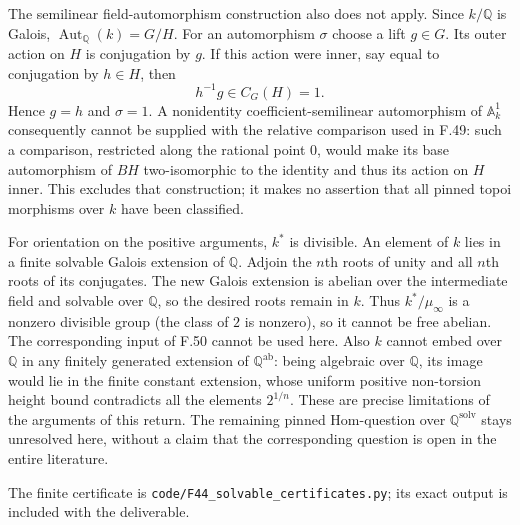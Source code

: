 The semilinear field-automorphism construction also does not apply.
Since $k/\mathbb Q$ is Galois,
$\operatorname{Aut}_{\mathbb Q}(k)=G/H$. For an automorphism
$\sigma$ choose a lift $g\in G$. Its outer action on $H$ is
conjugation by $g$. If this action were inner, say equal to
conjugation by $h\in H$, then
\[
                       h^{-1}g\in C_G(H)=1.
\]
Hence $g=h$ and $\sigma=1$. A nonidentity coefficient-semilinear
automorphism of $\mathbb A^1_k$ consequently cannot be supplied with
the relative comparison used in F.49: such a comparison, restricted
along the rational point $0$, would make its base automorphism of
$BH$ two-isomorphic to the identity and thus its action on $H$
inner. This excludes that construction; it makes no assertion that
all pinned topoi morphisms over $k$ have been classified.

For orientation on the positive arguments, $k^*$ is divisible.
An element of $k$ lies in a finite solvable Galois extension of
$\mathbb Q$. Adjoin the $n$th roots of unity and all $n$th roots
of its conjugates. The new Galois extension is abelian over the
intermediate field and solvable over $\mathbb Q$, so the desired
roots remain in $k$. Thus $k^*/\mu_\infty$ is a nonzero divisible group (the class of
$2$ is nonzero), so it cannot be free abelian. The corresponding
input of F.50 cannot be used here. Also $k$ cannot embed over $\mathbb Q$
in any finitely generated extension of $\mathbb Q^{\mathrm{ab}}$:
being algebraic over $\mathbb Q$, its image would lie in the finite
constant extension, whose uniform positive non-torsion height bound
contradicts all the elements $2^{1/n}$. These are precise limitations
of the arguments of this return. The remaining pinned Hom-question
over $\mathbb Q^{\mathrm{solv}}$ stays unresolved here, without a
claim that the corresponding question is open in the entire
literature.

The finite certificate is
\texttt{code/F44\_solvable\_certificates.py}; its exact output is
included with the deliverable.
